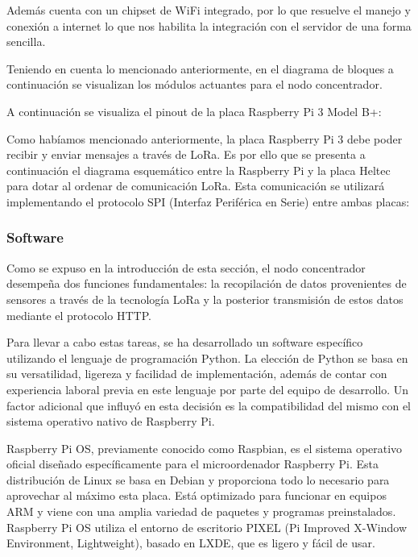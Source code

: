 Además cuenta con un chipset de WiFi integrado, por lo que resuelve el manejo y conexión a internet lo que nos habilita la integración con el servidor de una forma sencilla.

Teniendo en cuenta lo mencionado anteriormente, en el diagrama de bloques a continuación se visualizan los módulos actuantes para el nodo concentrador.



A continuación se visualiza el pinout de la placa Raspberry Pi 3 Model B+:


Como habíamos mencionado anteriormente, la placa Raspberry Pi 3 debe poder recibir y enviar mensajes a través de LoRa. Es por ello que se presenta a continuación el diagrama esquemático entre la Raspberry Pi y la placa Heltec para dotar al ordenar de comunicación LoRa. Esta comunicación se utilizará implementando el protocolo SPI (Interfaz Periférica en Serie) entre ambas placas:


\subsubsection{Software}
Como se expuso en la introducción de esta sección, el nodo concentrador desempeña dos funciones fundamentales: la recopilación de datos provenientes de sensores a través de la tecnología LoRa y la posterior transmisión de estos datos mediante el protocolo HTTP.

Para llevar a cabo estas tareas, se ha desarrollado un software específico utilizando el lenguaje de programación Python. La elección de Python se basa en su versatilidad, ligereza y facilidad de implementación, además de contar con experiencia laboral previa en este lenguaje por parte del equipo de desarrollo. Un factor adicional que influyó en esta decisión es la compatibilidad del mismo con el sistema operativo nativo de Raspberry Pi.

Raspberry Pi OS, previamente conocido como Raspbian, es el sistema operativo oficial diseñado específicamente para el microordenador Raspberry Pi. Esta distribución de Linux se basa en Debian y proporciona todo lo necesario para aprovechar al máximo esta placa. Está optimizado para funcionar en equipos ARM y viene con una amplia variedad de paquetes y programas preinstalados. Raspberry Pi OS utiliza el entorno de escritorio PIXEL (Pi Improved X-Window Environment, Lightweight), basado en LXDE, que es ligero y fácil de usar.


